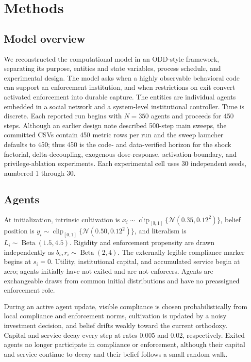 \section{Methods}

\subsection{Model overview}

We reconstructed the computational model in an ODD-style framework, separating its purpose, entities and state variables, process schedule, and experimental design. The model asks when a highly observable behavioral code can support an enforcement institution, and when restrictions on exit convert activated enforcement into durable capture. The entities are individual agents embedded in a social network and a system-level institutional controller. Time is discrete. Each reported run begins with \(N=350\) agents and proceeds for 450 steps. Although an earlier design note described 500-step main sweeps, the committed CSVs contain 450 metric rows per run and the sweep launcher defaults to 450; thus 450 is the code- and data-verified horizon for the shock factorial, delta-decoupling, exogenous dose-response, activation-boundary, and privilege-ablation experiments. Each experimental cell uses 30 independent seeds, numbered 1 through 30.

\subsection{Agents}

At initialization, intrinsic cultivation is \(x_i\sim\operatorname{clip}_{[0,1]}\{\mathcal{N}(0.35,0.12^2)\}\), belief position is \(y_i\sim\operatorname{clip}_{[0,1]}\{\mathcal{N}(0.50,0.12^2)\}\), and literalism is \(L_i\sim\operatorname{Beta}(1.5,4.5)\). Rigidity and enforcement propensity are drawn independently as \(b_i,r_i\sim\operatorname{Beta}(2,4)\). The externally legible compliance marker begins at \(s_i=0\). Utility, institutional capital, and accumulated service begin at zero; agents initially have not exited and are not enforcers. Agents are exchangeable draws from common initial distributions and have no preassigned enforcement role.

During an active agent update, visible compliance is chosen probabilistically from local compliance and enforcement norms, cultivation is updated by a noisy investment decision, and belief drifts weakly toward the current orthodoxy. Capital and service decay every step at rates 0.005 and 0.02, respectively. Exited agents no longer participate in compliance or enforcement, although their capital and service continue to decay and their belief follows a small random walk.

